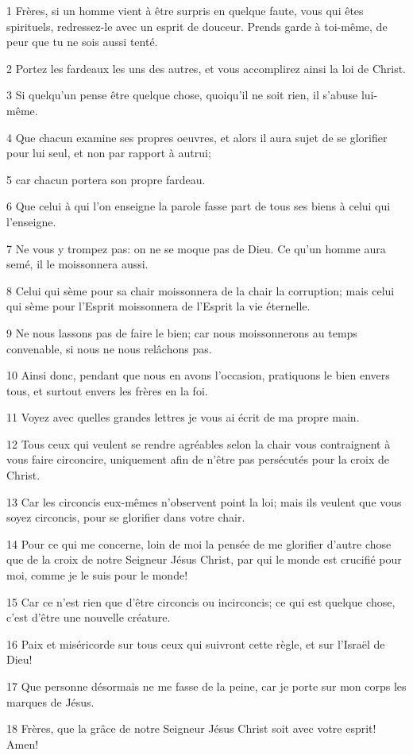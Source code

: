 \par 1 Frères, si un homme vient à être surpris en quelque faute, vous qui êtes spirituels, redressez-le avec un esprit de douceur. Prends garde à toi-même, de peur que tu ne sois aussi tenté.
\par 2 Portez les fardeaux les uns des autres, et vous accomplirez ainsi la loi de Christ.
\par 3 Si quelqu'un pense être quelque chose, quoiqu'il ne soit rien, il s'abuse lui-même.
\par 4 Que chacun examine ses propres oeuvres, et alors il aura sujet de se glorifier pour lui seul, et non par rapport à autrui;
\par 5 car chacun portera son propre fardeau.
\par 6 Que celui à qui l'on enseigne la parole fasse part de tous ses biens à celui qui l'enseigne.
\par 7 Ne vous y trompez pas: on ne se moque pas de Dieu. Ce qu'un homme aura semé, il le moissonnera aussi.
\par 8 Celui qui sème pour sa chair moissonnera de la chair la corruption; mais celui qui sème pour l'Esprit moissonnera de l'Esprit la vie éternelle.
\par 9 Ne nous lassons pas de faire le bien; car nous moissonnerons au temps convenable, si nous ne nous relâchons pas.
\par 10 Ainsi donc, pendant que nous en avons l'occasion, pratiquons le bien envers tous, et surtout envers les frères en la foi.
\par 11 Voyez avec quelles grandes lettres je vous ai écrit de ma propre main.
\par 12 Tous ceux qui veulent se rendre agréables selon la chair vous contraignent à vous faire circoncire, uniquement afin de n'être pas persécutés pour la croix de Christ.
\par 13 Car les circoncis eux-mêmes n'observent point la loi; mais ils veulent que vous soyez circoncis, pour se glorifier dans votre chair.
\par 14 Pour ce qui me concerne, loin de moi la pensée de me glorifier d'autre chose que de la croix de notre Seigneur Jésus Christ, par qui le monde est crucifié pour moi, comme je le suis pour le monde!
\par 15 Car ce n'est rien que d'être circoncis ou incirconcis; ce qui est quelque chose, c'est d'être une nouvelle créature.
\par 16 Paix et miséricorde sur tous ceux qui suivront cette règle, et sur l'Israël de Dieu!
\par 17 Que personne désormais ne me fasse de la peine, car je porte sur mon corps les marques de Jésus.
\par 18 Frères, que la grâce de notre Seigneur Jésus Christ soit avec votre esprit! Amen!


